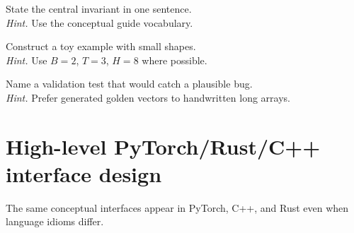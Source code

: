 \begin{chapterexercises}
\item State the central invariant in one sentence.\\
\textit{Hint.} Use the conceptual guide vocabulary.
\item Construct a toy example with small shapes.\\
\textit{Hint.} Use $B=2$, $T=3$, $H=8$ where possible.
\item Name a validation test that would catch a plausible bug.\\
\textit{Hint.} Prefer generated golden vectors to handwritten long arrays.
\end{chapterexercises}

\chapter{High-level PyTorch/Rust/C++ interface design}
\label{ch:interfaces}
The same conceptual interfaces appear in PyTorch, C++, and Rust even when language idioms differ.


